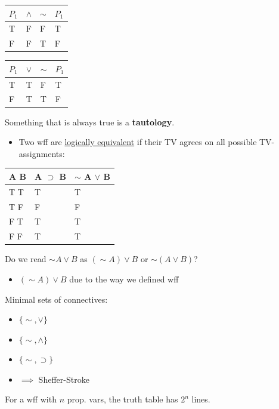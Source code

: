 \documentclass[11pt]{article}
\begin{document}
\begin{center}
\begin{tabular}{llll}
\(P_1\) & \(\wedge\) & \(\sim\) & \(P_1\)\\
\hline
T & F & F & T\\
F & F & T & F\\
\end{tabular}
\end{center}


\begin{center}
\begin{tabular}{llll}
\(P_1\) & \(\vee\) & \(\sim\) & \(P_1\)\\
\hline
T & T & F & T\\
F & T & T & F\\
\end{tabular}
\end{center}
Something that is always true is a \textbf{tautology}.
\begin{itemize}
\item Two wff are \uline{logically equivalent} if their TV agrees on all possible TV-assignments:
\end{itemize}
\begin{center}
\begin{tabular}{lll}
A B & A \(\supset\) B & \(\sim\) A \(\vee\) B\\
\hline
T T & T & T\\
T F & F & F\\
F T & T & T\\
F F & T & T\\
\end{tabular}
\end{center}

Do we read \(\sim A \vee B\) as \((\sim A) \vee B\) or \(\sim(A \vee B)\)?
\begin{itemize}
\item \((\sim A)\vee B\) due to the way we defined wff
\end{itemize}

Minimal sets of connectives: 
\begin{itemize}
\item \(\{\sim, \vee \}\)
\item \(\{\sim, \wedge\}\)
\item \(\{\sim, \supset\}\)
\item \(\implies\) Sheffer-Stroke
\end{itemize}

For a wff with \(n\) prop. vars, the truth table has \(2^n\) lines.
\end{document}
